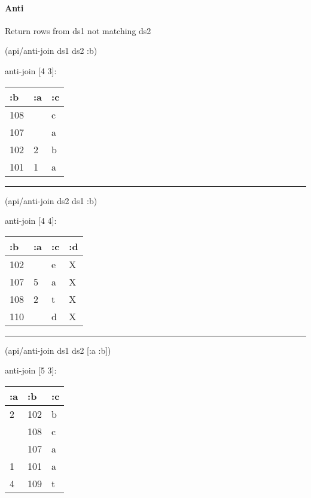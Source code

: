 \documentclass[]{article}
\newenvironment{Shaded}{\begin{snugshade}}{\end{snugshade}}
\newcommand{\AttributeTok}[1]{\textcolor[rgb]{0.77,0.63,0.00}{#1}}
\newcommand{\NormalTok}[1]{#1}
\let\oldparagraph\paragraph
\renewcommand{\paragraph}[1]{\oldparagraph{#1}\mbox{}}
\begin{document}
\hypertarget{anti}{%
\paragraph{Anti}\label{anti}}

Return rows from ds1 not matching ds2

\begin{Shaded}
\begin{Highlighting}[]
\NormalTok{(api/anti-join ds1 ds2 }\AttributeTok{:b}\NormalTok{)}
\end{Highlighting}
\end{Shaded}

anti-join {[}4 3{]}:

\begin{longtable}[]{@{}lll@{}}
\toprule
:b & :a & :c\tabularnewline
\midrule
\endhead
108 & & c\tabularnewline
107 & & a\tabularnewline
102 & 2 & b\tabularnewline
101 & 1 & a\tabularnewline
\bottomrule
\end{longtable}

\begin{center}\rule{0.5\linewidth}{0.5pt}\end{center}

\begin{Shaded}
\begin{Highlighting}[]
\NormalTok{(api/anti-join ds2 ds1 }\AttributeTok{:b}\NormalTok{)}
\end{Highlighting}
\end{Shaded}

anti-join {[}4 4{]}:

\begin{longtable}[]{@{}llll@{}}
\toprule
:b & :a & :c & :d\tabularnewline
\midrule
\endhead
102 & & e & X\tabularnewline
107 & 5 & a & X\tabularnewline
108 & 2 & t & X\tabularnewline
110 & & d & X\tabularnewline
\bottomrule
\end{longtable}

\begin{center}\rule{0.5\linewidth}{0.5pt}\end{center}

\begin{Shaded}
\begin{Highlighting}[]
\NormalTok{(api/anti-join ds1 ds2 [}\AttributeTok{:a} \AttributeTok{:b}\NormalTok{])}
\end{Highlighting}
\end{Shaded}

anti-join {[}5 3{]}:

\begin{longtable}[]{@{}lll@{}}
\toprule
:a & :b & :c\tabularnewline
\midrule
\endhead
2 & 102 & b\tabularnewline
& 108 & c\tabularnewline
& 107 & a\tabularnewline
1 & 101 & a\tabularnewline
4 & 109 & t\tabularnewline
\bottomrule
\end{longtable}
\end{document}
